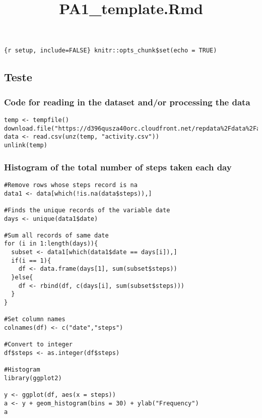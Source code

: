 \documentclass[
]{article}
\title{PA1\_template.Rmd}
\author{}
\date{\vspace{-2.5em}}
\begin{document}
\maketitle

\texttt{\{r\ setup,\ include=FALSE\}\ knitr::opts\_chunk\$set(echo\ =\ TRUE)}

\hypertarget{teste}{%
\subsection{Teste}\label{teste}}

\hypertarget{code-for-reading-in-the-dataset-andor-processing-the-data}{%
\subsubsection{Code for reading in the dataset and/or processing the
data}\label{code-for-reading-in-the-dataset-andor-processing-the-data}}

\begin{verbatim}
temp <- tempfile()
download.file("https://d396qusza40orc.cloudfront.net/repdata%2Fdata%2Factivity.zip",temp)
data <- read.csv(unz(temp, "activity.csv"))
unlink(temp)
\end{verbatim}

\hypertarget{histogram-of-the-total-number-of-steps-taken-each-day}{%
\subsubsection{Histogram of the total number of steps taken each
day}\label{histogram-of-the-total-number-of-steps-taken-each-day}}

\begin{verbatim}
#Remove rows whose steps record is na
data1 <- data[which(!is.na(data$steps)),]

#Finds the unique records of the variable date
days <- unique(data1$date)

#Sum all records of same date
for (i in 1:length(days)){
  subset <- data1[which(data1$date == days[i]),]
  if(i == 1){
    df <- data.frame(days[1], sum(subset$steps))
  }else{
    df <- rbind(df, c(days[i], sum(subset$steps)))
  }
}

#Set column names
colnames(df) <- c("date","steps")

#Convert to integer
df$steps <- as.integer(df$steps)

#Histogram
library(ggplot2)

y <- ggplot(df, aes(x = steps)) 
a <- y + geom_histogram(bins = 30) + ylab("Frequency")
a
\end{verbatim}
\end{document}
